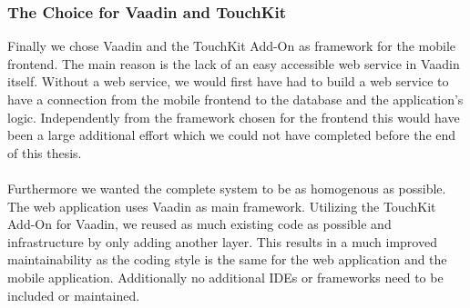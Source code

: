 \subsubsection{The Choice for Vaadin and TouchKit}
Finally we chose Vaadin and the TouchKit Add-On as framework for the mobile frontend. The main reason is the lack of an easy accessible web service in Vaadin itself. Without a web service, we would first have had to build a web service to have a connection from the mobile frontend to the database and the application's logic. Independently from the framework chosen for the frontend this would have been a large additional effort which we could not have completed before the end of this thesis.
\\
\\
Furthermore we wanted the complete system to be as homogenous as possible. The web application uses Vaadin as main framework. Utilizing the TouchKit Add-On for Vaadin, we reused as much existing code as possible and infrastructure by only adding another layer. This results in a much improved maintainability as the coding style is the same for the web application and the mobile application. Additionally no additional IDEs or frameworks need to be included or maintained.

